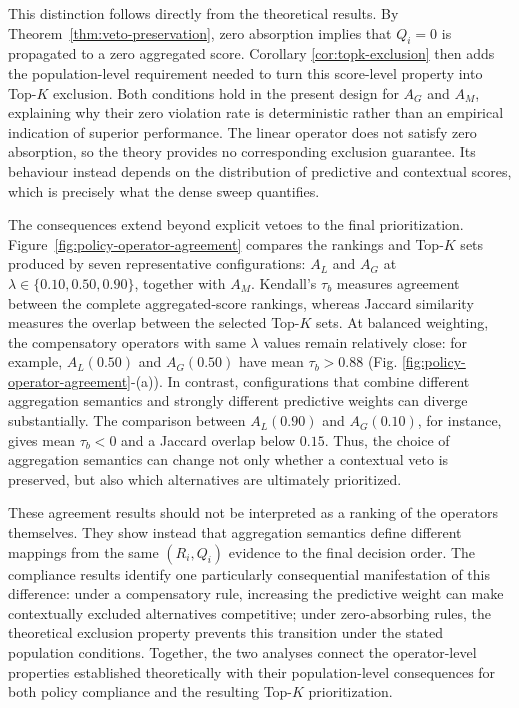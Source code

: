 \documentclass[mathematics,article,submit,moreauthors]{Definitions/mdpi}
\begin{document}
This distinction follows directly from the theoretical results. By
Theorem~\ref{thm:veto-preservation}, zero absorption implies that
$Q_i=0$ is propagated to a zero aggregated score. Corollary
\ref{cor:topk-exclusion} then adds the population-level requirement needed
to turn this score-level property into Top-$K$ exclusion. Both conditions
hold in the present design for $A_G$ and $A_M$, explaining why their
zero violation rate is deterministic rather than an empirical indication
of superior performance. The linear operator does not satisfy zero
absorption, so the theory provides no corresponding exclusion guarantee.
Its behaviour instead depends on the distribution of predictive and
contextual scores, which is precisely what the dense sweep quantifies. 

The consequences extend beyond explicit vetoes to the final 
prioritization. Figure~\ref{fig:policy-operator-agreement} compares the
rankings and Top-$K$ sets produced by seven representative configurations:
$A_L$ and $A_G$ at $\lambda\in\{0.10,0.50,0.90\}$, together with $A_M$.
Kendall's $\tau_b$ measures agreement between the complete aggregated-score
rankings, whereas Jaccard similarity measures the overlap between the
selected Top-$K$ sets. At balanced weighting, the compensatory operators
with same $\lambda$ values remain relatively close: for example, $A_L(0.50)$ and $A_G(0.50)$ have
mean $\tau_b>0.88$ (Fig. \ref{fig:policy-operator-agreement}-(a)). In contrast, configurations that combine different
aggregation semantics and strongly different predictive weights can
diverge substantially. The comparison between $A_L(0.90)$ and
$A_G(0.10)$, for instance, gives mean $\tau_b<0$ and a Jaccard overlap
below $0.15$. Thus, the choice of aggregation semantics can change not only
whether a contextual veto is preserved, but also which alternatives are
ultimately prioritized.

These agreement results should not be interpreted as a ranking of the
operators themselves. They show instead that aggregation semantics define
different mappings from the same $(R_i,Q_i)$ evidence to the final decision
order. The compliance results identify one particularly consequential
manifestation of this difference: under a compensatory rule, increasing
the predictive weight can make contextually excluded alternatives
competitive; under zero-absorbing rules, the theoretical exclusion property
prevents this transition under the stated population conditions. Together,
the two analyses connect the operator-level properties established
theoretically with their population-level consequences for both policy
compliance and the resulting Top-$K$ prioritization.
\end{document}

